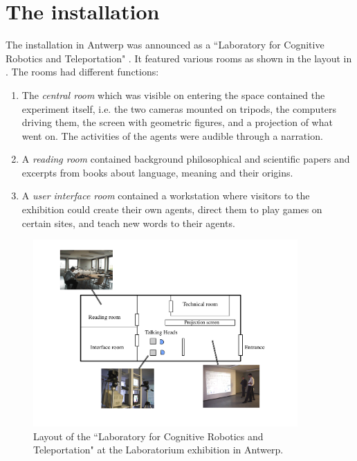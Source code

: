 \section{The installation}

The installation in Antwerp was announced as a ``Laboratory for Cognitive Robotics and Teleportation" \citep{Steels:99b}.
It featured various rooms as shown in the layout in . The rooms had different functions: 
\begin{enumerate} 
\item The {\itshape central room} which was visible on entering the space contained the experiment itself, i.e. the 
two cameras mounted on tripods, the computers driving them, the screen with geometric figures, and a projection of 
what went on. The activities of the agents were audible through a narration. 
\clearpage
\item A {\itshape reading room} contained background philosophical and scientific 
papers and excerpts from books about language, meaning and their origins. 
\item A {\itshape user interface room} contained a workstation where visitors to the exhibition could create their own 
agents, direct them to play games on certain sites, and teach new words to their agents. 
\end{enumerate}

\begin{figure}[bp]
  \centerline{\includegraphics[width=0.9\textwidth]{chap8/figures/layout.pdf}}
\caption{\label{fig:layout}Layout of the ``Laboratory for Cognitive Robotics and Teleportation" at the Laboratorium exhibition in Antwerp.}
\end{figure}


